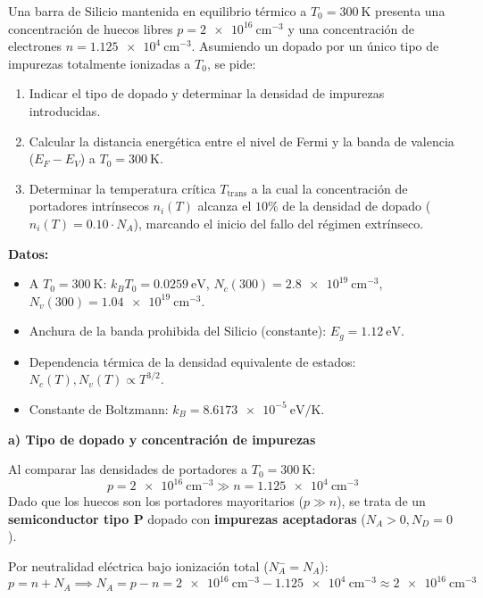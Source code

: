 \newpage
\begin{problema}
Una barra de Silicio mantenida en equilibrio térmico a $T_0 = \SI{300}{\kelvin}$ presenta una concentración de huecos libres $p = \SI{2e16}{\cm^{-3}}$ y una concentración de electrones $n = \SI{1.125e4}{\cm^{-3}}$. Asumiendo un dopado por un único tipo de impurezas totalmente ionizadas a $T_0$, se pide:
\begin{enumerate}[label=\alph*)]
    \item Indicar el tipo de dopado y determinar la densidad de impurezas introducidas.
    \item Calcular la distancia energética entre el nivel de Fermi y la banda de valencia ($E_F - E_V$) a $T_0 = \SI{300}{\kelvin}$.
    \item Determinar la temperatura crítica $T_{\text{trans}}$ a la cual la concentración de portadores intrínsecos $n_i(T)$ alcanza el $10\%$ de la densidad de dopado ($n_i(T) = 0.10 \cdot N_A$), marcando el inicio del fallo del régimen extrínseco.
\end{enumerate}

\textbf{Datos:}
\begin{itemize}
    \item A $T_0 = \SI{300}{\kelvin}$: $k_B T_0 = \SI{0.0259}{\eV}$, $N_c(300) = \SI{2.8e19}{\cm^{-3}}$, $N_v(300) = \SI{1.04e19}{\cm^{-3}}$.
    \item Anchura de la banda prohibida del Silicio (constante): $E_g = \SI{1.12}{\eV}$.
    \item Dependencia térmica de la densidad equivalente de estados: $N_c(T), N_v(T) \propto T^{3/2}$.
    \item Constante de Boltzmann: $k_B = \SI{8.6173e-5}{\eV/\kelvin}$.
\end{itemize}

\tcblower

\textbf{a) Tipo de dopado y concentración de impurezas}

Al comparar las densidades de portadores a $T_0 = \SI{300}{\kelvin}$:
\[
p = \SI{2e16}{\cm^{-3}} \gg n = \SI{1.125e4}{\cm^{-3}}
\]
Dado que los huecos son los portadores mayoritarios ($p \gg n$), se trata de un \textbf{semiconductor tipo P} dopado con \textbf{impurezas aceptadoras} ($N_A > 0, N_D = 0$).

Por neutralidad eléctrica bajo ionización total ($N_A^- = N_A$):
\[
p = n + N_A \implies N_A = p - n = \SI{2e16}{\cm^{-3}} - \SI{1.125e4}{\cm^{-3}} \approx \SI{2e16}{\cm^{-3}}
\]


\end{problema}
